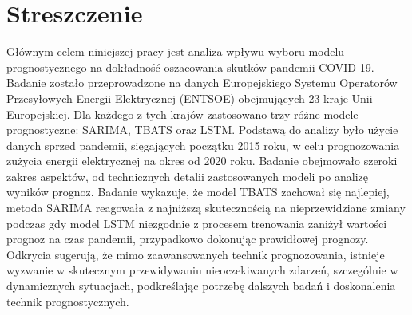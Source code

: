 \documentclass[polish, twoside, 12pt, a4paper]{article}
\theoremstyle{definition}
\theoremstyle{plain}
\theoremstyle{remark}
\begin{document}
\clearpage
{}
\section*{Streszczenie}

Głównym celem niniejszej pracy jest analiza wpływu wyboru modelu prognostycznego na dokładność oszacowania skutków pandemii COVID-19. Badanie zostało przeprowadzone na danych Europejskiego Systemu Operatorów Przesyłowych Energii Elektrycznej (ENTSOE) obejmujących 23 kraje Unii Europejskiej. Dla każdego z tych krajów zastosowano trzy różne modele prognostyczne: SARIMA, TBATS oraz LSTM. Podstawą do analizy było użycie danych sprzed pandemii, sięgających początku 2015 roku, w celu prognozowania zużycia energii elektrycznej na okres od 2020 roku. Badanie obejmowało szeroki zakres aspektów, od technicznych detalii zastosowanych modeli po analizę wyników prognoz. Badanie wykazuje, że model TBATS zachował się najlepiej, metoda SARIMA reagowała z najniższą skutecznością na nieprzewidziane zmiany podczas gdy model LSTM niezgodnie z procesem trenowania zaniżył wartości prognoz na czas pandemii, przypadkowo dokonując prawidłowej prognozy. Odkrycia sugerują, że mimo zaawansowanych technik prognozowania, istnieje wyzwanie w skutecznym przewidywaniu nieoczekiwanych zdarzeń, szczególnie w dynamicznych sytuacjach, podkreślając potrzebę dalszych badań i doskonalenia technik prognostycznych.
\end{document}
